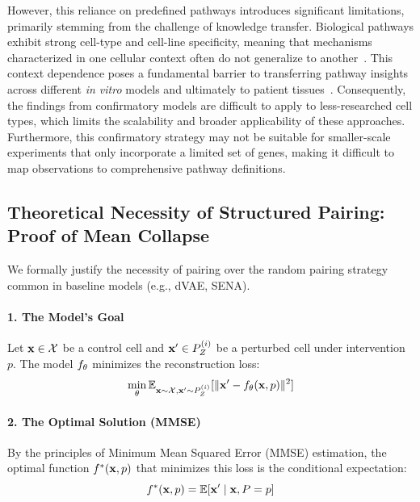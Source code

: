 However, this reliance on predefined pathways introduces significant limitations, primarily stemming from the challenge of knowledge transfer.
Biological pathways exhibit strong cell-type and cell-line specificity, meaning that mechanisms characterized in one cellular context often do not generalize to another~\citep{schneider2017tissue,gamazon2018using,hekselman2020mechanisms}.
This context dependence poses a fundamental barrier to transferring pathway insights across different \emph{in vitro} models and ultimately to patient tissues~\citep{walter2019biological}.
Consequently, the findings from confirmatory models are difficult to apply to less-researched cell types, which limits the scalability and broader applicability of these approaches.
Furthermore, this confirmatory strategy may not be suitable for smaller-scale experiments that only incorporate a limited set of genes, making it difficult to map observations to comprehensive pathway definitions.

\subsection{Theoretical Necessity of Structured Pairing: Proof of Mean Collapse}
\label{app:theory:mean_collapse}

We formally justify the necessity of  pairing over the random pairing strategy common in baseline models (e.g., dVAE, SENA).

\paragraph{1. The Model's Goal}
Let ${\mathbf{x}} \in \mathcal{X}$ be a control cell and ${\mathbf{x}}' \in P_Z^{(i)}$ be a perturbed cell under intervention $p$. The model $f_\theta$ minimizes the reconstruction loss:
\begin{equation}
    \min_\theta \mathbb{E}_{{\mathbf{x}} \sim \mathcal{X}, {\mathbf{x}}' \sim P_Z^{(i)}} [ \| {\mathbf{x}}' - f_\theta({\mathbf{x}}, p) \|^2 ]
\end{equation}

\paragraph{2. The Optimal Solution (MMSE)}
By the principles of Minimum Mean Squared Error (MMSE) estimation, the optimal function $f^*({\mathbf{x}}, p)$ that minimizes this loss is the conditional expectation:
\begin{equation}
    f^*({\mathbf{x}}, p) = \mathbb{E}[{\mathbf{x}}' \mid {\mathbf{x}}, P=p]
\end{equation}

